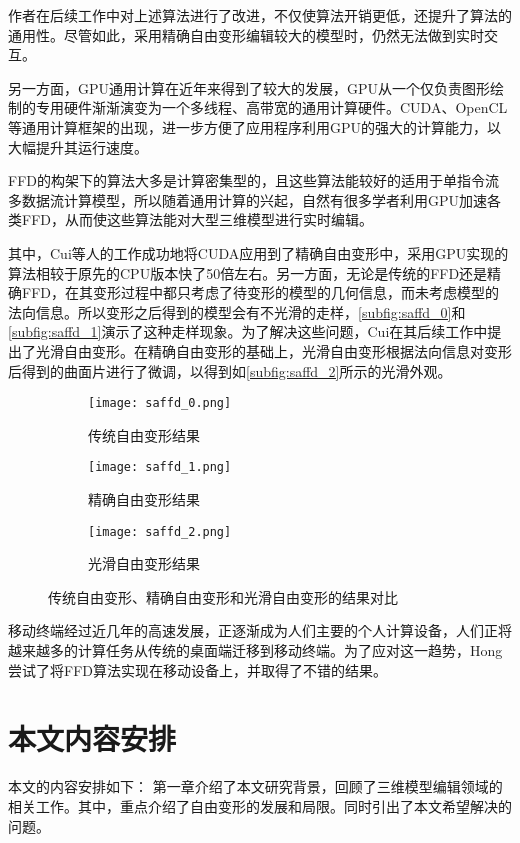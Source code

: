 作者在后续工作\cite{Feng00, Feng02}中对上述算法进行了改进，不仅使算法开销更低，还提升了算法的通用性。尽管如此，采用精确自由变形编辑较大的模型时，仍然无法做到实时交互。

另一方面，GPU通用计算在近年来得到了较大的发展，GPU从一个仅负责图形绘制的专用硬件渐渐演变为一个多线程、高带宽的通用计算硬件。CUDA、OpenCL等通用计算框架的出现，进一步方便了应用程序利用GPU的强大的计算能力，以大幅提升其运行速度。

FFD的构架下的算法大多是计算密集型的，且这些算法能较好的适用于单指令流多数据流计算模型，所以随着通用计算的兴起，自然有很多学者利用GPU加速各类FFD\cite{chua2000, modat2010}，从而使这些算法能对大型三维模型进行实时编辑。

其中，Cui等人\cite{Cui13, Cui14}的工作成功地将CUDA应用到了精确自由变形中，采用GPU实现的算法相较于原先的CPU版本快了50倍左右。另一方面，无论是传统的FFD还是精确FFD，在其变形过程中都只考虑了待变形的模型的几何信息，而未考虑模型的法向信息。所以变形之后得到的模型会有不光滑的走样，\autoref{subfig:saffd_0}和\autoref{subfig:saffd_1}演示了这种走样现象。为了解决这些问题，Cui在其后续工作\cite{Cui15}中提出了光滑自由变形。在精确自由变形的基础上，光滑自由变形根据法向信息对变形后得到的曲面片进行了微调，以得到如\autoref{subfig:saffd_2}所示的光滑外观。

\begin{figure}[htbp]
	\centering
	\begin{subfigure}[b]{.3\textwidth}
		\centering
		\texttt{[image: saffd\_0.png]}
		\caption{传统自由变形结果}\label{subfig:saffd_0}
	\end{subfigure}
	\quad
	\begin{subfigure}[b]{.3\textwidth}
		\centering
		\texttt{[image: saffd\_1.png]}
		\caption{精确自由变形结果}\label{subfig:saffd_1}
	\end{subfigure}
	\quad
	\begin{subfigure}[b]{.3\textwidth}
		\centering
		\texttt{[image: saffd\_2.png]}
		\caption{光滑自由变形结果}\label{subfig:saffd_2}
	\end{subfigure}
    \caption{传统自由变形、精确自由变形和光滑自由变形的结果对比}\label{fig:sample_problem_saffd}
\end{figure}

移动终端经过近几年的高速发展，正逐渐成为人们主要的个人计算设备，人们正将越来越多的计算任务从传统的桌面端迁移到移动终端。为了应对这一趋势，Hong\cite{hong2013}尝试了将FFD算法实现在移动设备上，并取得了不错的结果。


\section{本文内容安排}
本文的内容安排如下：
第一章介绍了本文研究背景，回顾了三维模型编辑领域的相关工作。其中，重点介绍了自由变形的发展和局限。同时引出了本文希望解决的问题。

